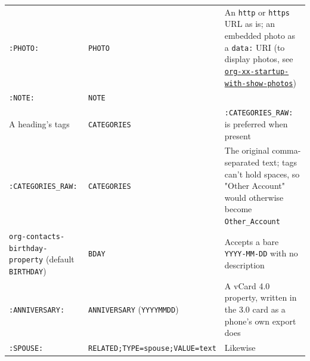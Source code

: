 \documentclass[11pt]{article}
\begin{document}
\begin{center}
\begin{tabular}{lll}
\texttt{:PHOTO:} & \texttt{PHOTO} & An \texttt{http} or \texttt{https} URL as is; an embedded photo as a \texttt{data:} URI (to display photos, see \hyperref[sec:org761a631]{\texttt{org-xx-startup-with-show-photos}})\\[0pt]
\texttt{:NOTE:} & \texttt{NOTE} & \\[0pt]
A heading's tags & \texttt{CATEGORIES} & \texttt{:CATEGORIES\_RAW:} is preferred when present\\[0pt]
\texttt{:CATEGORIES\_RAW:} & \texttt{CATEGORIES} & The original comma-separated text; tags can't hold spaces, so "Other Account" would otherwise become \texttt{Other\_Account}\\[0pt]
\texttt{org-contacts-birthday-property} (default \texttt{BIRTHDAY}) & \texttt{BDAY} & Accepts a bare \texttt{YYYY-MM-DD} with no description\\[0pt]
\texttt{:ANNIVERSARY:} & \texttt{ANNIVERSARY} (\texttt{YYYYMMDD}) & A vCard 4.0 property, written in the 3.0 card as a phone's own export does\\[0pt]
\texttt{:SPOUSE:} & \texttt{RELATED;TYPE=spouse;VALUE=text} & Likewise\\[0pt]
\end{tabular}
\end{center}
\end{document}

